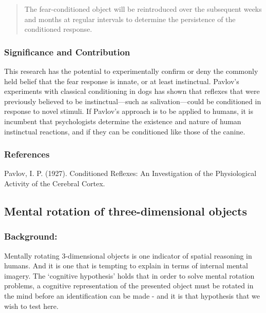 \begin{refsection}
\begin{quote}
The fear-conditioned object will be reintroduced over the subsequent weeks and months at regular intervals to determine the persistence of the conditioned response. 
\end{quote}

\subsubsection{Significance and Contribution}
\label{significanceandcontribution}

This research has the potential to experimentally confirm or deny the commonly held belief that the fear response is innate, or at least instinctual. Pavlov's experiments with classical conditioning in dogs has shown that reflexes that were previously believed to be instinctual---such as salivation---could be conditioned in response to novel stimuli. If Pavlov's approach is to be applied to humans, it is incumbent that psychologists determine the existence and nature of human instinctual reactions, and if they can be conditioned like those of the canine.

\subsubsection{References}
\label{references}

Pavlov, I. P. (1927). Conditioned Reflexes: An Investigation of the Physiological Activity of the Cerebral Cortex. 

\newpage

\subsection{Mental rotation of three-dimensional objects}
\label{mentalrotationofthree-dimensionalobjects}

\subsubsection{Background:}
\label{background:}

Mentally rotating 3-dimensional objects is one indicator of spatial reasoning in humans. And it is one that is tempting to explain in terms of internal mental imagery. The `cognitive hypothesis' holds that in order to solve mental rotation problems, a cognitive representation of the presented object must be rotated in the mind before an identification can be made - and it is that hypothesis that we wish to test here.


\end{refsection}
